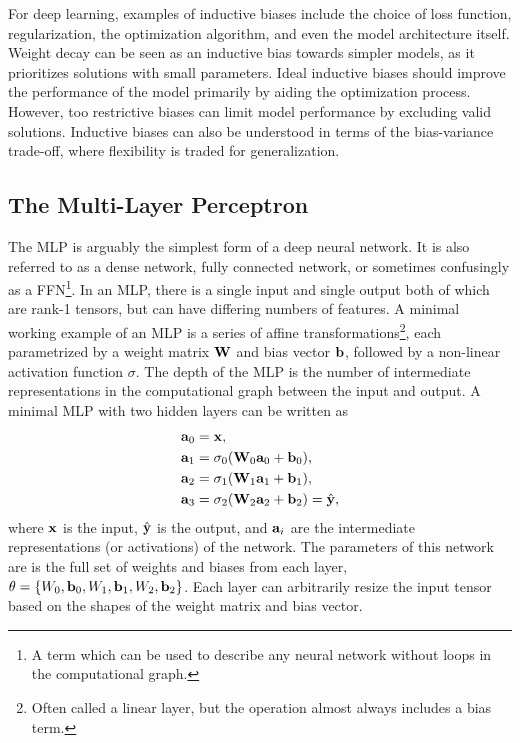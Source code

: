For deep learning, examples of inductive biases include the choice of loss function, regularization, the optimization algorithm, and even the model architecture itself.
Weight decay can be seen as an inductive bias towards simpler models, as it prioritizes solutions with small parameters.
Ideal inductive biases should improve the performance of the model primarily by aiding the optimization process.
However, too restrictive biases can limit model performance by excluding valid solutions.
Inductive biases can also be understood in terms of the bias-variance trade-off, where flexibility is traded for generalization.

\subsection{The Multi-Layer Perceptron}

The \Gls{MLP} is arguably the simplest form of a deep neural network.
It is also referred to as a dense network, fully connected network, or sometimes confusingly as a \Gls{FFN}\footnote{A term which can be used to describe any neural network without loops in the computational graph.}.
In an \Gls{MLP}, there is a single input and single output both of which are rank-1 tensors, but can have differing numbers of features.
A minimal working example of an \Gls{MLP} is a series of affine transformations\footnote{Often called a linear layer, but the operation almost always includes a bias term.}, each parametrized by a weight matrix $\mathbf{W}$ and bias vector $\mathbf{b}$, followed by a non-linear activation function $\sigma$.
The depth of the \Gls{MLP} is the number of intermediate representations in the computational graph between the input and output.
A minimal \Gls{MLP} with two hidden layers can be written as
\begin{align}
    \mathbf{a}_0 & = \mathbf{x},                                        \\
    \mathbf{a}_1 & = \sigma_0(\mathbf{W}_0 \mathbf{a}_0 + \mathbf{b}_0),            \\
    \mathbf{a}_2 & = \sigma_1(\mathbf{W}_1 \mathbf{a}_1 + \mathbf{b}_1),            \\
    \mathbf{a}_3 & = \sigma_2(\mathbf{W}_2 \mathbf{a}_2 + \mathbf{b}_2) = \hat{\mathbf{y}},
\end{align}
where $\mathbf{x}$ is the input, $\hat{\mathbf{y}}$ is the output, and $\mathbf{a}_i$ are the intermediate representations (or activations) of the network.
The parameters of this network are is the full set of weights and biases from each layer, $\theta = \{W_0, \mathbf{b}_0, W_1, \mathbf{b}_1, W_2, \mathbf{b}_2\}$.
Each layer can arbitrarily resize the input tensor based on the shapes of the weight matrix and bias vector.

